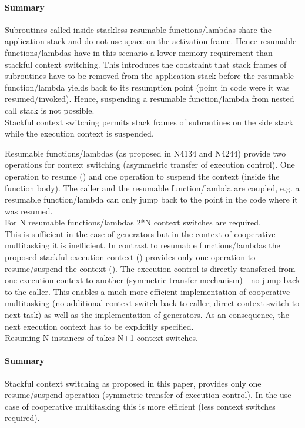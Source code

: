 \paragraph*{Summary}
Subroutines called inside stackless resumable functions/lambdas share the
application stack and do not use space on the activation frame. Hence resumable
functions/lambdas have in this scenario a lower memory requirement than stackful
context switching. This introduces the constraint that stack frames of
subroutines have to be removed from the application stack before the resumable
function/lambda yields back to its resumption point (point in code were it was
resumed/invoked). Hence, suspending a resumable function/lambda from nested call
stack is not possible.\\
\newline
Stackful context switching permits stack frames of subroutines on the side stack
while the execution context is suspended.

Resumable functions/lambdas (as proposed in N4134 and N4244) provide two
operations for context switching (asymmetric transfer of execution control).
One operation to resume () and one operation to suspend the
context (\yield inside the function body). The caller and the resumable
function/lambda are coupled, e.g. a resumable function/lambda can only jump back
to the point in the code where it was resumed.\\
\newline
For N resumable functions/lambdas 2*N context switches are required.\\
This is sufficient in the case of generators but in the context of cooperative
multitasking it is inefficient.
In contrast to resumable functions/lambdas the proposed stackful execution
context (\ectx) provides only one operation to resume/suspend the context
(\ectxop). The execution control is directly transfered from one
execution context to another (symmetric transfer-mechanism) - no jump back to
the caller. This enables a much more efficient implementation of cooperative
multitasking (no additional context switch back to caller; direct context switch
to next task) as well as the implementation of generators. As an consequence,
the next execution context has to be explicitly specified.\\
\newline
Resuming N instances of \ectx takes N+1 context switches.
\paragraph*{Summary}
Stackful context switching as proposed in this paper, provides only one
resume/suspend operation (symmetric transfer of execution control). In the use
case of cooperative multitasking this is more efficient (less context switches
required).

